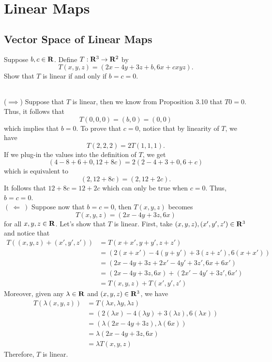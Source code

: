 \chapter{Linear Maps}

\section{Vector Space of Linear Maps}

\begin{exercise}
    Suppose $b,c \in \mathbf{R}$. Define $T: \mathbf{R}^3 \to \mathbf{R}^2$ by
    $$T(x,y,z) = (2x-4y + 3z + b, 6x + cxyz).$$
    Show that $T$ is linear if and only if $b = c = 0$. \\
\end{exercise}

\begin{solution}
    \\ ($\implies$) Suppose that $T$ is linear, then we know from Proposition 3.10 that $T0 = 0$. Thus, it follows that
    $$T(0,0,0) = (b, 0) = (0,0)$$
    which implies that $b = 0$. To prove that $c = 0$, notice that by linearity of $T$, we have
    $$T(2,2,2) = 2T(1,1,1).$$
    If we plug-in the values into the definition of $T$, we get
    $$(4 - 8 + 6 + 0, 12 + 8c) = 2(2 - 4 + 3 + 0, 6 + c)$$
    which is equivalent to
    $$(2, 12 + 8c) = (2, 12 + 2c).$$
    It follows that $12 + 8c = 12 + 2c$ which can only be true when $c = 0$. Thus, $b = c = 0$. \\
    $( \ \Longleftarrow \ )$ Suppose now that $b = c = 0$, then $T(x,y,z)$ becomes
    $$T(x,y,z) = (2x-4y + 3z, 6x)$$
    for all $x,y,z \in \mathbf{R}$. Let's show that $T$ is linear. First, take $(x,y,z), (x',y',z') \in \mathbf{R}^3$ and notice that
    \begin{align*}
        T((x,y,z) + (x',y',z')) &= T(x+x', y+y', z+z') \\
        &= (2(x + x')-4(y+y') + 3(z+z'), 6(x+x')) \\
        &= (2x - 4y + 3z + 2x' - 4y' + 3z', 6x + 6x') \\
        &= (2x-4y + 3z, 6x) + (2x'-4y' + 3z', 6x') \\
        &= T(x,y,z) + T(x',y',z')
    \end{align*}
    Moreover, given any $\lambda \in \mathbf{R}$ and $(x,y,z) \in \mathbf{R}^3$, we have
    \begin{align*}
        T(\lambda(x,y,z)) &= T(\lambda x, \lambda y, \lambda z) \\
        &= (2(\lambda x)-4(\lambda y) + 3(\lambda z), 6(\lambda x)) \\
        &= (\lambda(2x - 4y + 3z), \lambda(6x)) \\
        &= \lambda(2x - 4y + 3z, 6x) \\
        &= \lambda T(x,y,z)
    \end{align*}
    Therefore, $T$ is linear.\\
\end{solution}

